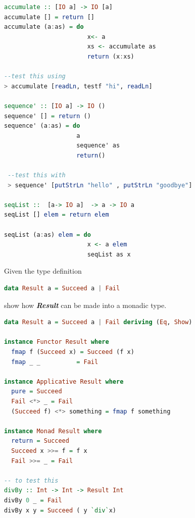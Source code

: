 \documentclass{article}
\begin{document}
\begin{solution}
\begin{lstlisting}[language=Haskell]
accumulate :: [IO a] -> IO [a]
accumulate [] = return []
accumulate (a:as) = do 
                       x<- a                       
                       xs <- accumulate as
                       return (x:xs)
                       
--test this using 
> accumulate [readLn, testf "hi", readLn]
           
sequence' :: [IO a] -> IO ()
sequence' [] = return ()
sequence' (a:as) = do 
                    a
                    sequence' as
                    return()
                    
 --test this with
 > sequence' [putStrLn "hello" , putStrLn "goodbye"]
                    
seqList ::  [a-> IO a]  -> a -> IO a 
seqList [] elem = return elem

seqList (a:as) elem = do
                       x <- a elem
                       seqList as x


\end{lstlisting}
\end{solution}

\begin{exercise}
Given the type definition
\begin{lstlisting}[language=Haskell]
  	data Result a = Succeed a | Fail	
\end{lstlisting}

show how \textit{\textbf{Result}}  can be made into a monadic type.
\end{exercise}

\begin{solution}
\begin{lstlisting}[language=Haskell]
  data Result a = Succeed a | Fail deriving (Eq, Show)

instance Functor Result where
  fmap f (Succeed x) = Succeed (f x)
  fmap _ _          = Fail

instance Applicative Result where 
  pure = Succeed
  Fail <*> _ = Fail
  (Succeed f) <*> something = fmap f something

instance Monad Result where
  return = Succeed
  Succeed x >>= f = f x
  Fail >>= _ = Fail
  
-- to test this 
divBy :: Int -> Int -> Result Int
divBy 0 _ = Fail
divBy x y = Succeed ( y `div`x)
\end{lstlisting}
\end{solution}
\end{document}
